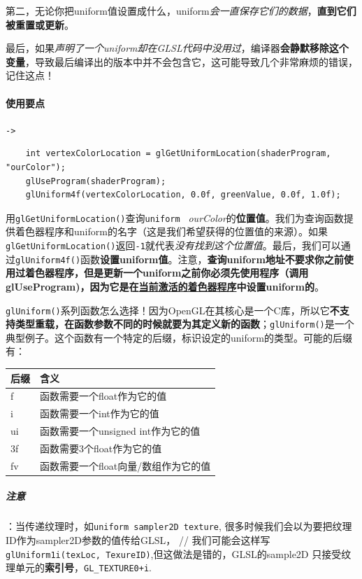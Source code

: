 \documentclass[UTF8,a4paper,12pt]{ctexbook}
\begin{document}
				第二，无论你把uniform值设置成什么，uniform\textit{会一直保存它们的数据}，\textbf{直到它们被重置或更新}。
			
			
				最后，如果\textit{声明了一个uniform却在GLSL代码中没用过}，编译器\textbf{会静默移除这个变量}，导致最后编译出的版本中并不会包含它，这可能导致几个非常麻烦的错误，记住这点！
			
			\paragraph{使用要点}\verb|->|
				\begin{lstlisting}
	int vertexColorLocation = glGetUniformLocation(shaderProgram, "ourColor");
	glUseProgram(shaderProgram);
	glUniform4f(vertexColorLocation, 0.0f, greenValue, 0.0f, 1.0f);
				\end{lstlisting}
				
				用\verb|glGetUniformLocation()|查询\verb|uniform | \textit{ourColor}的\textbf{位置值}。我们为查询函数提供着色器程序和uniform的名字（这是我们希望获得的位置值的来源）。如果\verb|glGetUniformLocation()|返回\verb|-1|就代表\textit{没有找到这个位置值}。最后，我们可以通过\verb|glUniform4f()|函数\textbf{设置uniform值}。注意，\textbf{查询uniform地址不要求你之前使用过着色器程序，但是更新一个uniform之前你必须先使用程序（调用glUseProgram)，因为它是在\underline{当前激活的着色器程序}中设置uniform的}。
				
				\verb|glUniform()|系列函数怎么选择！因为OpenGL在其核心是一个C库，所以它\textbf{不支持类型重载，在函数参数不同的时候就要为其定义新的函数}；\verb|glUniform()|是一个典型例子。这个函数有一个特定的后缀，标识设定的uniform的类型。可能的后缀有：
				\begin{table}[H]
					\centering
					\begin{tabular}{p{3cm}|p{10cm}}
						\toprule
							后缀 &  含义 	\\
						\midrule
							f	&	函数需要一个float作为它的值\\
							i	&	函数需要一个int作为它的值	\\
							ui	&	函数需要一个unsigned int作为它的值\\
							3f	&	函数需要3个float作为它的值		\\
							fv	&	函数需要一个float向量/数组作为它的值\\					
						\bottomrule
					\end{tabular}
				\end{table}
				
				\subparagraph{注意}：当传递纹理时，如\verb|uniform sampler2D texture|, 很多时候我们会以为要把纹理ID作为sampler2D参数的值传给GLSL，  
				// 我们可能会这样写\verb|glUniform1i(texLoc, TexureID)|,但这做法是错的，GLSL的sample2D 只接受纹理单元的\textbf{索引号}，\verb|GL_TEXTURE0+i|.
					
\end{document}
